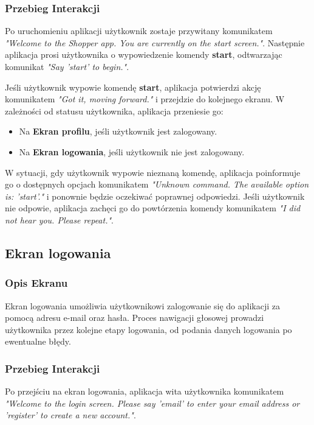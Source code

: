 \subsubsection{Przebieg Interakcji}
Po uruchomieniu aplikacji użytkownik zostaje przywitany komunikatem \textit{"Welcome to the Shopper app. You are currently on the start screen."}. Następnie aplikacja prosi użytkownika o wypowiedzenie komendy \textbf{start}, odtwarzając komunikat \textit{"Say 'start' to begin."}.

Jeśli użytkownik wypowie komendę \textbf{start}, aplikacja potwierdzi akcję komunikatem \textit{"Got it, moving forward."} i przejdzie do kolejnego ekranu. W zależności od statusu użytkownika, aplikacja przeniesie go:

\begin{itemize}
    \item Na \textbf{Ekran profilu}, jeśli użytkownik jest zalogowany.
    \item Na \textbf{Ekran logowania}, jeśli użytkownik nie jest zalogowany.
\end{itemize}

W sytuacji, gdy użytkownik wypowie nieznaną komendę, aplikacja poinformuje go o dostępnych opcjach komunikatem \textit{"Unknown command. The available option is: 'start'."} i ponownie będzie oczekiwać poprawnej odpowiedzi. Jeśli użytkownik nie odpowie, aplikacja zachęci go do powtórzenia komendy komunikatem \textit{"I did not hear you. Please repeat."}.

\subsection{Ekran logowania}

\subsubsection{Opis Ekranu}
Ekran logowania umożliwia użytkownikowi zalogowanie się do aplikacji za pomocą adresu e-mail oraz hasła. Proces nawigacji głosowej prowadzi użytkownika przez kolejne etapy logowania, od podania danych logowania po ewentualne błędy.

\subsubsection{Przebieg Interakcji}
Po przejściu na ekran logowania, aplikacja wita użytkownika komunikatem \textit{"Welcome to the login screen. Please say 'email' to enter your email address or 'register' to create a new account."}.

